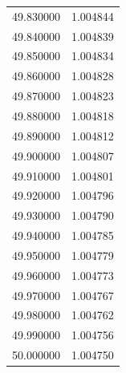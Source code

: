 \begin{tabular}{rr}
49.830000 & 1.004844 \\
49.840000 & 1.004839 \\
49.850000 & 1.004834 \\
49.860000 & 1.004828 \\
49.870000 & 1.004823 \\
49.880000 & 1.004818 \\
49.890000 & 1.004812 \\
49.900000 & 1.004807 \\
49.910000 & 1.004801 \\
49.920000 & 1.004796 \\
49.930000 & 1.004790 \\
49.940000 & 1.004785 \\
49.950000 & 1.004779 \\
49.960000 & 1.004773 \\
49.970000 & 1.004767 \\
49.980000 & 1.004762 \\
49.990000 & 1.004756 \\
50.000000 & 1.004750 \\
\bottomrule
\end{tabular}
